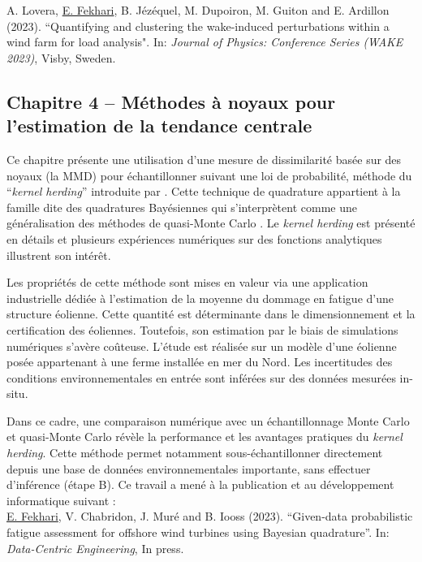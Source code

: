 \noindent
{} A. Lovera, \underline{E. Fekhari}, B. Jézéquel, M. Dupoiron, M. Guiton and E. Ardillon (2023). ``Quantifying and clustering the wake-induced perturbations within a wind farm for load analysis". In: \textit{Journal of Physics: Conference Series (WAKE 2023)}, Visby, Sweden. 

\subsection*{Chapitre 4 -- Méthodes à noyaux pour l'estimation de la tendance centrale}

Ce chapitre présente une utilisation d'une mesure de dissimilarité basée sur des noyaux (la MMD) pour échantillonner suivant une loi de probabilité, méthode du ``\textit{kernel herding}'' introduite par \citet{chen_welling_2010}. 
Cette technique de quadrature appartient à la famille dite des \og quadratures Bayésiennes \fg{} \citep{briol_oates_2019} qui s'interprètent comme une généralisation des méthodes de quasi-Monte Carlo \citep{hickernell_2020}. 
Le \textit{kernel herding} est présenté en détails et plusieurs expériences numériques sur des fonctions analytiques illustrent son intérêt. 

Les propriétés de cette méthode sont mises en valeur via une application industrielle dédiée à l'estimation de la moyenne du dommage en fatigue d'une structure éolienne. 
Cette quantité est déterminante dans le dimensionnement et la certification des éoliennes. 
Toutefois, son estimation par le biais de simulations numériques s'avère coûteuse. 
L'étude est réalisée sur un modèle d'une éolienne posée appartenant à une ferme installée en mer du Nord. 
Les incertitudes des conditions environnementales en entrée sont inférées sur des données mesurées in-situ. 

Dans ce cadre, une comparaison numérique avec un échantillonnage Monte Carlo et quasi-Monte Carlo révèle la performance et les avantages pratiques du \textit{kernel herding}.
Cette méthode permet notamment sous-échantillonner directement depuis une base de données environnementales importante, sans effectuer d'inférence (étape B). 
Ce travail a mené à la publication et au développement informatique suivant : \\

\noindent
{} \underline{E. Fekhari}, V. Chabridon, J. Muré and B. Iooss (2023). ``Given-data probabilistic fatigue assessment for offshore wind turbines using Bayesian quadrature''. In: \textit{Data-Centric Engineering}, In press.\\

